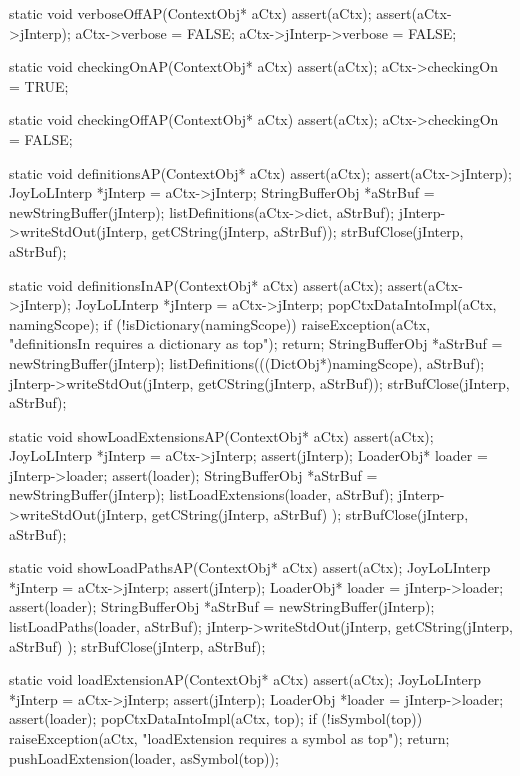\startCCode
static void verboseOffAP(ContextObj* aCtx) {
  assert(aCtx);
  assert(aCtx->jInterp);
  aCtx->verbose = FALSE;
  aCtx->jInterp->verbose = FALSE;
}
\stopCCode

\startCCode
static void checkingOnAP(ContextObj* aCtx) {
  assert(aCtx);
  aCtx->checkingOn = TRUE;
}
\stopCCode

\startCCode
static void checkingOffAP(ContextObj* aCtx) {
  assert(aCtx);
  aCtx->checkingOn = FALSE;
}
\stopCCode

\startCCode
static void definitionsAP(ContextObj* aCtx) {
  assert(aCtx);
  assert(aCtx->jInterp);
  JoyLoLInterp *jInterp = aCtx->jInterp;
  StringBufferObj *aStrBuf = newStringBuffer(jInterp);
  listDefinitions(aCtx->dict, aStrBuf);
  jInterp->writeStdOut(jInterp, getCString(jInterp, aStrBuf));
  strBufClose(jInterp, aStrBuf);
}
\stopCCode

\startCCode
static void definitionsInAP(ContextObj* aCtx) {
  assert(aCtx);
  assert(aCtx->jInterp);
  JoyLoLInterp *jInterp = aCtx->jInterp;
  popCtxDataIntoImpl(aCtx, namingScope);
  if (!isDictionary(namingScope)) {
    raiseException(aCtx,
      "definitionsIn requires a dictionary as top");
    return;
  }
  StringBufferObj *aStrBuf = newStringBuffer(jInterp);
  listDefinitions(((DictObj*)namingScope), aStrBuf);
  jInterp->writeStdOut(jInterp, getCString(jInterp, aStrBuf));
  strBufClose(jInterp, aStrBuf);
}
\stopCCode

\startCCode
static void showLoadExtensionsAP(ContextObj* aCtx) {
  assert(aCtx);
  JoyLoLInterp *jInterp = aCtx->jInterp;
  assert(jInterp);
  LoaderObj* loader = jInterp->loader;
  assert(loader);
  StringBufferObj *aStrBuf =
    newStringBuffer(jInterp);
  listLoadExtensions(loader, aStrBuf);
  jInterp->writeStdOut(jInterp,
    getCString(jInterp, aStrBuf)
  );
  strBufClose(jInterp, aStrBuf);
}
\stopCCode

\startCCode
static void showLoadPathsAP(ContextObj* aCtx) {
  assert(aCtx);
  JoyLoLInterp *jInterp = aCtx->jInterp;
  assert(jInterp);
  LoaderObj* loader = jInterp->loader;
  assert(loader);
  StringBufferObj *aStrBuf =
    newStringBuffer(jInterp);
  listLoadPaths(loader, aStrBuf);
  jInterp->writeStdOut(jInterp,
    getCString(jInterp, aStrBuf)
  );
  strBufClose(jInterp, aStrBuf);  
}
\stopCCode

\startCCode
static void loadExtensionAP(ContextObj* aCtx) {
  assert(aCtx);
  JoyLoLInterp *jInterp = aCtx->jInterp;
  assert(jInterp);
  LoaderObj *loader = jInterp->loader;
  assert(loader);
  popCtxDataIntoImpl(aCtx, top);
  if (!isSymbol(top)) {
    raiseException(aCtx,
      "loadExtension requires a symbol as top");
    return;
  }
  pushLoadExtension(loader, asSymbol(top));
}
\stopCCode


